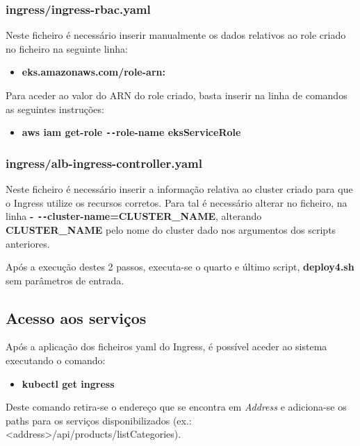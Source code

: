 \documentclass[11pt,a4paper]{article}
\begin{document}
\subsubsection{ingress/ingress-rbac.yaml}
Neste ficheiro é necessário inserir manualmente os dados relativos ao role criado no ficheiro na seguinte linha:
\begin{itemize}
	\item \textbf{eks.amazonaws.com/role-arn:}
\end{itemize}
Para aceder ao valor do ARN do role criado, basta inserir na linha de comandos as seguintes instruções:
\begin{itemize}
	\item \textbf{aws iam get-role \texttt{-{}-}role-name eksServiceRole}
\end{itemize}

\subsubsection{ingress/alb-ingress-controller.yaml}
Neste ficheiro é necessário inserir a informação relativa ao cluster criado para que o Ingress utilize os recursos corretos. Para tal é necessário alterar no ficheiro, na linha \textbf{- \texttt{-{}-}cluster-name=CLUSTER\_NAME},
alterando \textbf{CLUSTER\_NAME} pelo nome do cluster dado nos argumentos dos scripts anteriores.

Após a execução destes 2 passos, executa-se o quarto e último script, \textbf{deploy4.sh} sem parâmetros de entrada.

\subsection{Acesso aos serviços}
Após a aplicação dos ficheiros yaml do Ingress, é possível aceder ao sistema executando o comando:
\begin{itemize}
	\item \textbf{kubectl get ingress}
\end{itemize}
Deste comando retira-se o endereço que se encontra em \textit{Address} e adiciona-se os paths para os serviços disponibilizados (ex.: <address>/api/products/listCategories).
\end{document}
